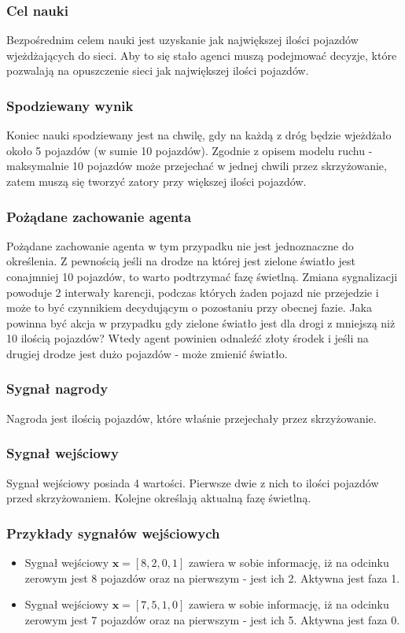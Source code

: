 \documentclass[12pt]{book}
\theoremstyle{plain}
\begin{document}
\subsubsection{Cel nauki}
Bezpośrednim celem nauki jest uzyskanie jak największej ilości pojazdów wjeżdżających do sieci. Aby to się stało agenci muszą podejmować decyzje, które pozwalają na opuszczenie sieci jak największej ilości pojazdów. 
\subsubsection{Spodziewany wynik}
Koniec nauki spodziewany jest na chwilę, gdy na każdą z dróg będzie wjeżdżało około 5 pojazdów (w sumie 10 pojazdów). Zgodnie z opisem modelu ruchu - maksymalnie 10 pojazdów może przejechać w jednej chwili przez skrzyżowanie, zatem muszą się tworzyć zatory przy większej ilości pojazdów.
\subsubsection{Pożądane zachowanie agenta}
Pożądane zachowanie agenta w tym przypadku nie jest jednoznaczne do określenia. Z pewnością jeśli na drodze na której jest zielone światło jest conajmniej 10 pojazdów, to warto podtrzymać fazę świetlną. Zmiana sygnalizacji powoduje 2 interwały karencji, podczas których żaden pojazd nie przejedzie i może to być czynnikiem decydującym o pozostaniu przy obecnej fazie. Jaka powinna być akcja w przypadku gdy zielone światło jest dla drogi z mniejszą niż 10 ilością pojazdów? Wtedy agent powinien odnaleźć złoty środek i jeśli na drugiej drodze jest dużo pojazdów - może zmienić światło.
\subsubsection*{Sygnał nagrody}
Nagroda jest ilością pojazdów, które właśnie przejechały przez skrzyżowanie.
\subsubsection*{Sygnał wejściowy}
Sygnał wejściowy posiada 4 wartości. Pierwsze dwie z nich to ilości pojazdów przed skrzyżowaniem. Kolejne określają aktualną fazę świetlną.
\subsubsection*{Przykłady sygnałów wejściowych}
\begin{itemize}
	\item Sygnał wejściowy $ \textbf{x}=[8,2,0,1] $ zawiera w sobie informację, iż na odcinku zerowym jest 8 pojazdów oraz na pierwszym - jest ich 2. Aktywna jest faza 1.
		\item Sygnał wejściowy $ \textbf{x}=[7,5,1,0] $ zawiera w sobie informację, iż na odcinku zerowym jest 7 pojazdów oraz na pierwszym - jest ich 5. Aktywna jest faza 0.
\end{itemize}
\end{document}
